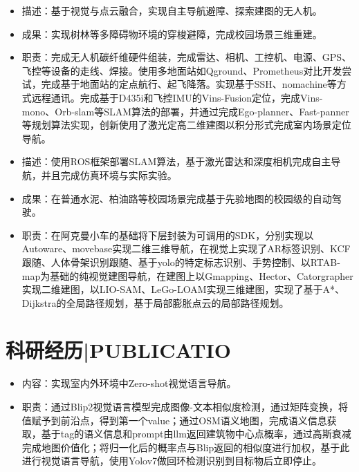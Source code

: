 \documentclass{resume}
\begin{document}
\begin{itemize}
    \item 描述：基于视觉与点云融合，实现自主导航避障、探索建图的无人机。
    \item 成果：实现树林等多障碍物环境的穿梭避障，完成校园场景三维重建。
    \item 职责：完成无人机碳纤维硬件组装，完成雷达、相机、工控机、电源、GPS、飞控等设备的走线、焊接。使用多地面站如Qground、Prometheus对比开发尝试，完成基于地面站的定点航行、起飞降落。实现基于SSH、nomachine等方式远程通讯。完成基于D435i和飞控IMU的Vins-Fusion定位，完成Vins-mono、Orb-slam等SLAM算法的部署，并通过完成Ego-planner、Fast-panner等规划算法实现，创新使用了激光定高二维建图以积分形式完成室内场景定位导航。
\end{itemize}

\begin{itemize}
    \item 描述：使用ROS框架部署SLAM算法，基于激光雷达和深度相机完成自主导航，并且完成仿真环境与实际实验。
    \item 成果：在普通水泥、柏油路等校园场景完成基于先验地图的校园级的自动驾驶。
    \item 职责：在阿克曼小车的基础将下层封装为可调用的SDK，分别实现以Autoware、movebase实现二维三维导航，在视觉上实现了AR标签识别、KCF跟随、人体骨架识别跟随、基于yolo的特定标志识别、手势控制、以RTAB-map为基础的纯视觉建图导航，在建图上以Gmapping、Hector、Catorgrapher实现二维建图，以LIO-SAM、LeGo-LOAM实现三维建图，实现了基于A*、Dijkstra的全局路径规划，基于局部膨胀点云的局部路径规划。
\end{itemize}




\section{科研经历|PUBLICATIO}

\begin{itemize}
    \item 内容：实现室内外环境中Zero-shot视觉语言导航。
    \item 职责：通过Blip2视觉语言模型完成图像-文本相似度检测，通过矩阵变换，将值赋予到前沿点，得到第一个value；通过OSM语义地图，完成语义信息获取，基于tag的语义信息和prompt由llm返回建筑物中心点概率，通过高斯衰减完成地图价值化；将归一化后的概率点与Blip返回的相似度进行加权，基于此进行视觉语言导航，使用Yolov7做回环检测识别到目标物后立即停止。
\end{itemize}
\end{document}
